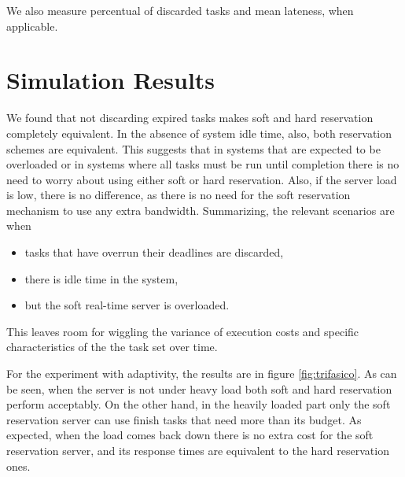 \documentclass[times, 10pt,twocolumn]{article}
\begin{document}
We also measure percentual of discarded tasks and mean lateness, when
applicable.

\section{Simulation Results}
\label{sec:simulation-results}

We found that not discarding expired tasks makes soft and hard
reservation completely equivalent. In the absence of system idle time,
also, both reservation schemes are equivalent. This suggests that in
systems that are expected to be overloaded or in systems where all
tasks must be run until completion there is no need to worry about
using either soft or hard reservation. Also, if the server load is
low, there is no difference, as there is no need for the soft
reservation mechanism to use any extra bandwidth. Summarizing, the
relevant scenarios are when
\begin{itemize}
\item tasks that have overrun their deadlines are discarded,
\item there is idle time in the system,
\item but the soft real-time server is overloaded.
\end{itemize}
This leaves room for wiggling the variance of execution costs and
specific characteristics of the the task set over time.

\begin{figure*}[t]
  \centering
  \caption{Response times for the costs in figure
    \ref{fig:costs-trifasico}.}
  \label{fig:trifasico}
\end{figure*}

For the experiment with adaptivity, the results are in figure
\ref{fig:trifasico}. As can be seen, when the server is not under
heavy load both soft and hard reservation perform acceptably. On the
other hand, in the heavily loaded part only the soft reservation
server can use finish tasks that need more than its budget. As
expected, when the load comes back down there is no extra cost for the
soft reservation server, and its response times are equivalent to the
hard reservation ones.

\begin{figure*}[t]
  \centering
  \caption{Response times for the high variance case.}
  \label{fig:variance}
\end{figure*}
\end{document}
